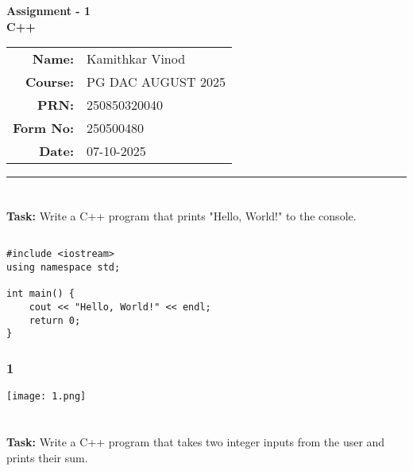 \documentclass[12pt,a4paper]{article}
\begin{document}
\begin{center}
    \LARGE \textbf{Assignment - 1} \\[0.5cm]
    \Large \textbf{C++} \\[1cm]

    \begin{tabular}{rl}
        \textbf{Name:} & Kamithkar Vinod \\
        \textbf{Course:} & PG DAC AUGUST 2025 \\
        \textbf{PRN:} & 250850320040 \\
        \textbf{Form No:} & 250500480 \\
        \textbf{Date:} & 07-10-2025 \\
    \end{tabular}
\end{center}

\vspace{1cm}
\hrule
\vspace{0.5cm}

\section{}
\textbf{Task:} Write a C++ program that prints "Hello, World!" to the console.

\subsection{}
\begin{lstlisting}
#include <iostream>
using namespace std;

int main() {
    cout << "Hello, World!" << endl;
    return 0;
}
\end{lstlisting}

\subsubsection{1}
\begin{center}
    \texttt{[image: 1.png]}
\end{center}



\section{}
\textbf{Task:} Write a C++ program that takes two integer inputs from the user and prints their sum.
\end{document}
